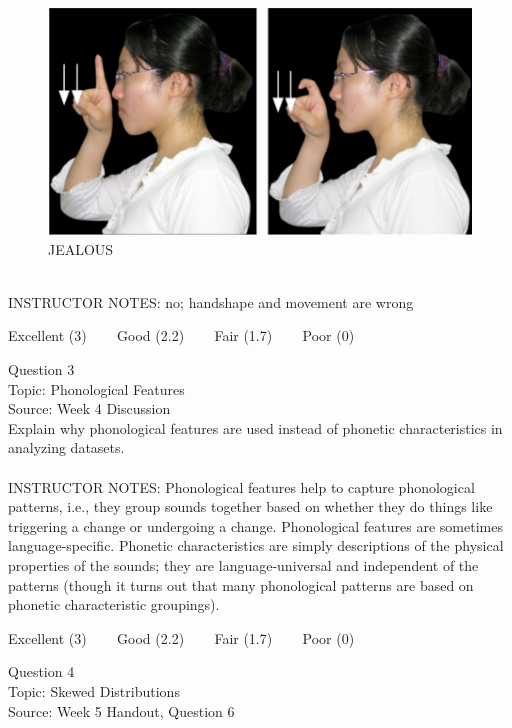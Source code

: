 \documentclass[12pt]{article}
\begin{document}
\begin{figure}[H]
\includegraphics{../images/taiwansign_jealous.png}
\caption{JEALOUS}
\end{figure}

~\\
INSTRUCTOR NOTES: no; handshape and movement are wrong


\vfill
Excellent (3) ~~~ Good (2.2) ~~~ Fair (1.7) ~~~ Poor (0)
\newpage

{\large Question 3}\\

Topic: Phonological Features\\
Source: Week 4 Discussion\\

Explain why phonological features are used instead of phonetic characteristics in analyzing datasets.\\


~\\
INSTRUCTOR NOTES: Phonological features help to capture phonological patterns, i.e., they group sounds together based on whether they do things like triggering a change or undergoing a change. Phonological features are sometimes language-specific. Phonetic characteristics are simply descriptions of the physical properties of the sounds; they are language-universal and independent of the patterns (though it turns out that many phonological patterns are based on phonetic characteristic groupings).


\vfill
Excellent (3) ~~~ Good (2.2) ~~~ Fair (1.7) ~~~ Poor (0)
\newpage

{\large Question 4}\\

Topic: Skewed Distributions\\
Source: Week 5 Handout, Question 6\\
\end{document}

